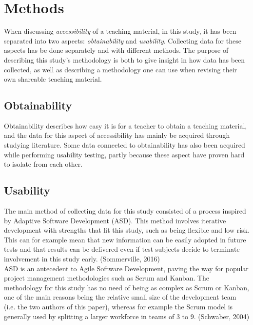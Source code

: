 \chapter{Methods}
When discussing \textit{accessibility} of a teaching material, in this study, it has been separated into two aspects: \textit{obtainability} and \textit{usability}. Collecting data for these aspects has be done separately and with different methods. The purpose of describing this study's methodology is both to give insight in how data has been collected, as well as describing a methodology one can use when revising their own shareable teaching material.

\section{Obtainability}
Obtainability describes how easy it is for a teacher to obtain a teaching material, and the data for this aspect of accessibility has mainly be acquired through studying literature. Some data connected to obtainability has also been acquired while performing usability testing, partly because these aspect have proven hard to isolate from each other.

\section{Usability}
The main method of collecting data for this study consisted of a process inspired by Adaptive Software Development (ASD). This method involves iterative development with strengths that fit this study, such as being flexible and low risk. This can for example mean that new information
can be easily adopted in future tests and that results can be delivered even if test subjects decide to terminate involvement in this study early. (Sommerville, 2016)\\
ASD is an antecedent to Agile Software Development, paving the way for popular project management methodologies such as Scrum and Kanban. The methodology for this study has no need of being as complex as Scrum or Kanban, one of the main reasons being the relative small size of the development team (i.e. the two authors of this paper), whereas for example the Scrum model is generally used by splitting a larger workforce in teams of 3 to 9. (Schwaber, 2004)\\

